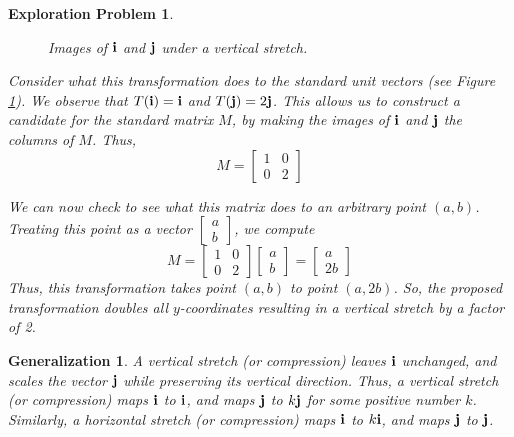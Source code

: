 \documentclass{ximera}
\renewcommand{\vec}[1]{{\bf #1}}
\newtheorem{general}{Generalization}
\newtheorem{initprob}{Exploration Problem}
\begin{document}
\begin{initprob}
\begin{figure}[h]
\begin{tikzpicture}[scale=1.5]
 \end{tikzpicture}

\caption{Images of $\vec{i}$ and $\vec{j}$ under a vertical stretch.}
  \label{fig:vstretchvectors} 
\end{figure}
Consider what this transformation does to the standard unit vectors (see Figure \ref{fig:vstretchvectors}).  We observe that $T(\vec{i})=\vec{i}$ and $T(\vec{j})=2\vec{j}$.  This allows us to construct a candidate for the standard matrix $M$, by making the images of $\vec{i}$ and $\vec{j}$ the columns of $M$.  Thus, 
$$M=\begin{bmatrix}
1 & 0\\
0 & 2
\end{bmatrix}$$

We can now check to see what this matrix does to an arbitrary point $(a, b)$.  Treating this point as a vector $\begin{bmatrix}a\\b\end{bmatrix}$, we compute
$$M=\begin{bmatrix}
1 & 0\\
0 & 2
\end{bmatrix}\begin{bmatrix}a\\b\end{bmatrix}=\begin{bmatrix}a\\2b\end{bmatrix}$$
 Thus, this transformation takes point $(a, b)$ to point $(a, 2b)$.  So, the proposed transformation doubles all $y$-coordinates resulting in a vertical stretch by a factor of 2.
\end{initprob}






\begin{general} A vertical stretch (or compression) leaves $\vec{i}$ unchanged, and scales the vector $\vec{j}$ while preserving its vertical direction.  Thus, a vertical stretch (or compression) maps $\vec{i}$ to $\vec{i}$, and maps $\vec{j}$ to $k\vec{j}$ for some positive number $k$.  Similarly, a horizontal stretch (or compression) maps $\vec{i}$ to $k\vec{i}$, and maps $\vec{j}$ to $\vec{j}$.
\end{general}
\end{document}
